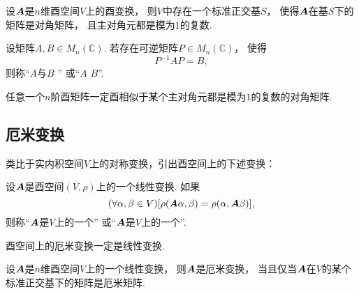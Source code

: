 \begin{theorem}
设\(\boldsymbol{A}\)是\(n\)维酉空间\(V\)上的酉变换，
则\(V\)中存在一个标准正交基\(S\)，
使得\(\boldsymbol{A}\)在基\(S\)下的矩阵是对角矩阵，
且主对角元都是模为\(1\)的复数.
\end{theorem}

\begin{definition}
设矩阵\(A,B \in M_n(\mathbb{C})\).
若存在可逆矩阵\(P \in M_n(\mathbb{C})\)，
使得\begin{equation}
	P^{-1} A P = B,
\end{equation}
则称“\(A\)与\(B\) ”
或“\(A\)  \(B\)”.
\end{definition}

\begin{corollary}
任意一个\(n\)阶酉矩阵一定酉相似于某个主对角元都是模为\(1\)的复数的对角矩阵.
\end{corollary}

\subsection{厄米变换}
类比于实内积空间\(V\)上的对称变换，引出酉空间上的下述变换：
\begin{definition}
设\(\boldsymbol{A}\)是酉空间\((V,\rho)\)上的一个线性变换.
如果\begin{equation*}
	(\forall \alpha,\beta \in V)
	[
		\rho(\boldsymbol{A}\alpha,\beta)
		= \rho(\alpha,\boldsymbol{A}\beta)
	],
\end{equation*}
则称“\(\boldsymbol{A}\)是\(V\)上的一个”
或“\(\boldsymbol{A}\)是\(V\)上的一个”.
\end{definition}

\begin{proposition}
酉空间上的厄米变换一定是线性变换.
\end{proposition}

\begin{proposition}
设\(\boldsymbol{A}\)是\(n\)维酉空间\(V\)上的一个线性变换，
则\(\boldsymbol{A}\)是厄米变换，
当且仅当\(\boldsymbol{A}\)在\(V\)的某个标准正交基下的矩阵是厄米矩阵.
\end{proposition}

